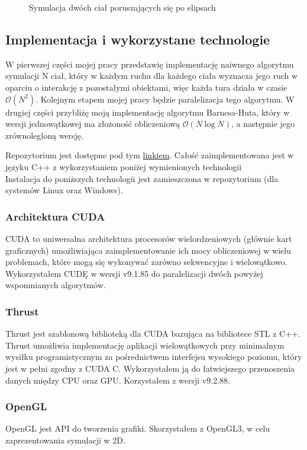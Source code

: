 \documentclass[14pt,twoside,a4paper]{article}
\begin{document}
\newpage

\begin{figure}
    \centering
    \def\svgwidth{\columnwidth}
    
    \caption{Symulacja dwóch ciał poruszających się po elipsach}
\end{figure}


\subsection{\Large Implementacja i wykorzystane technologie}
W pierwszej części mojej pracy przedstawię implementację naiwnego algorytmu symulacji N ciał, który w każdym ruchu dla każdego ciała wyznacza jego ruch w oparciu o interakcję z pozostałymi obiektami, więc każda tura działa w czasie $\mathcal{O}(N^{2})$. Kolejnym etapem mojej pracy będzie paralelizacja tego algorytmu.
W drugiej części przybliżę moją implementację algorytmu Barnesa-Huta, który w wersji jednowątkowej ma złożoność obliczeniową $\mathcal{O}(N\log{}N)$, a następnie jego zrównolegloną wersję.

Repozytorium jest dostępne pod tym \href{https://github.com/damian1996/N-Body-Simulation}{linkiem}.
Całość zaimplementowana jest w języku C++ z wykorzystaniem poniżej wymienionych technologii \\
Instalacja do poniższych technologii jest zamieszczona w repozytorium (dla systemów Linux oraz Windows).
\subsubsection{\large Architektura CUDA}
CUDA to uniwersalna architektura procesorów wielordzeniowych (głównie kart graficznych) umożliwiająca zaimplementowanie ich mocy obliczeniowej w wielu problemach, które mogą się wykonywać zarówno sekwencyjne i wielowątkowo. Wykorzystałem CUDĘ w wersji v9.1.85 do paralelizacji dwóch powyżej wspomnianych algorytmów.
\subsubsection{\large Thrust}
Thrust jest szablonową biblioteką dla CUDA bazująca na bibliotece STL z C++. Thrust umożliwia implementację aplikacji wielowątkowych przy minimalnym wysiłku programistycznym za pośrednictwem interfejsu wysokiego poziomu, który jest w pełni zgodny z CUDA C. Wykorzystałem ją do łatwiejszego przenoszenia danych między CPU oraz GPU. Korzystałem z wersji v9.2.88. 
\subsubsection{\large OpenGL}
OpenGL jest API do tworzenia grafiki. Skorzystałem z OpenGL3, w celu zaprezentowania symulacji w 2D.
\end{document}
